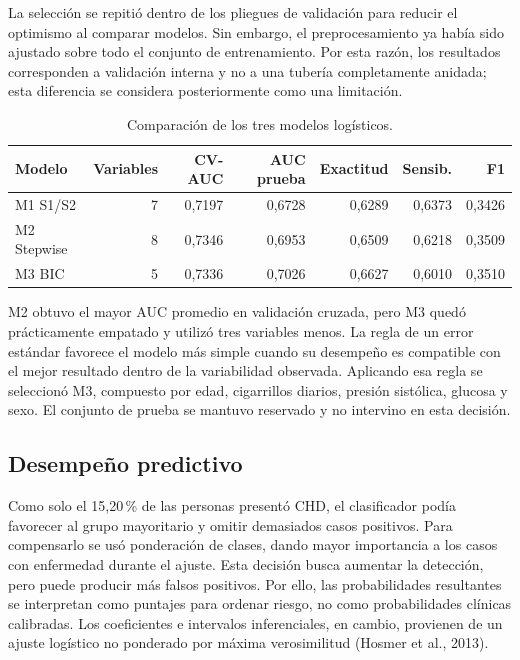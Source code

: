 \documentclass[10pt,a4paper]{article}
\newcommand{\compacttable}{\small\renewcommand{\arraystretch}{1.12}}
\begin{document}
La selección se repitió dentro de los pliegues de validación para reducir el optimismo al comparar modelos. Sin embargo, el preprocesamiento ya había sido ajustado sobre todo el conjunto de entrenamiento. Por esta razón, los resultados corresponden a validación interna y no a una tubería completamente anidada; esta diferencia se considera posteriormente como una limitación.

\begin{table}[htbp]
\centering
\caption{Comparación de los tres modelos logísticos.}
\label{tab:modelos}
\compacttable
\begin{tabular}{lrrrrrr}
\toprule
Modelo & Variables & CV-AUC & AUC prueba & Exactitud & Sensib. & F1 \\
\midrule
M1 S1/S2 & 7 & 0,7197 & 0,6728 & 0,6289 & 0,6373 & 0,3426 \\
M2 Stepwise & 8 & 0,7346 & 0,6953 & 0,6509 & 0,6218 & 0,3509 \\
M3 BIC & 5 & 0,7336 & 0,7026 & 0,6627 & 0,6010 & 0,3510 \\
\bottomrule
\end{tabular}
\end{table}

M2 obtuvo el mayor AUC promedio en validación cruzada, pero M3 quedó prácticamente empatado y utilizó tres variables menos. La regla de un error estándar favorece el modelo más simple cuando su desempeño es compatible con el mejor resultado dentro de la variabilidad observada. Aplicando esa regla se seleccionó M3, compuesto por edad, cigarrillos diarios, presión sistólica, glucosa y sexo. El conjunto de prueba se mantuvo reservado y no intervino en esta decisión.

\subsection{Desempeño predictivo}

Como solo el 15,20\,\% de las personas presentó CHD, el clasificador podía favorecer al grupo mayoritario y omitir demasiados casos positivos. Para compensarlo se usó ponderación de clases, dando mayor importancia a los casos con enfermedad durante el ajuste. Esta decisión busca aumentar la detección, pero puede producir más falsos positivos. Por ello, las probabilidades resultantes se interpretan como puntajes para ordenar riesgo, no como probabilidades clínicas calibradas. Los coeficientes e intervalos inferenciales, en cambio, provienen de un ajuste logístico no ponderado por máxima verosimilitud (Hosmer et al., 2013).
\end{document}

